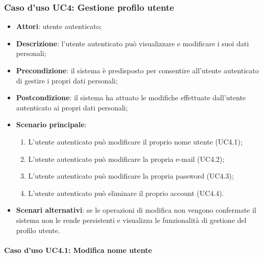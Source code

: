 \subsubsection{Caso d'uso UC4: Gestione profilo utente}

\begin{itemize}
	\item \textbf{Attori}: utente autenticato;
	\item \textbf{Descrizione}: l'utente autenticato può visualizzare e modificare i suoi dati personali;
	\item \textbf{Precondizione}: il sistema è predisposto per consentire all'utente autenticato di gestire i propri dati personali;
	\item \textbf{Postcondizione}: il sistema ha attuato le modifiche effettuate dall'utente autenticato ai propri dati personali;
	\item \textbf{Scenario principale}:
		\begin{enumerate}
			\item L'utente autenticato può modificare il proprio nome utente (UC4.1);
			\item L'utente autenticato può modificare la propria e-mail (UC4.2);
			\item L'utente autenticato può modificare la propria password (UC4.3);
			\item L'utente autenticato può eliminare il proprio account (UC4.4).
		\end{enumerate} 
	\item \textbf{Scenari alternativi}: se le operazioni di modifica non vengono confermate il sistema non le rende persistenti e visualizza le funzionalità di gestione del profilo utente. 
\end{itemize}

\paragraph{Caso d'uso UC4.1: Modifica nome utente}

